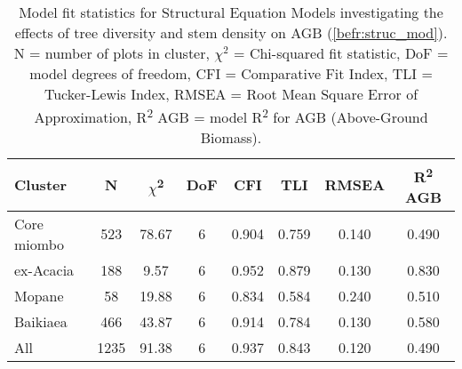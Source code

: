 \begin{table}[tb] 
	\caption[Model fit statistics per vegetation type]{Model fit statistics for Structural Equation Models investigating the effects of tree diversity and stem density on AGB (\autoref{befr:struc_mod}). N = number of plots in cluster, $\chi^{2}$ = Chi-squared fit statistic, DoF = model degrees of freedom, CFI = Comparative Fit Index, TLI = Tucker-Lewis Index, RMSEA = Root Mean Square Error of Approximation, R\textsuperscript{2} AGB = model R\textsuperscript{2} for AGB (Above-Ground Biomass).} 
	\label{befr:struc_model_fit_clust_stats} 
	\begin{tabular}{lS[table-format=4.0]S[table-format=2.2]S[table-format=1.0]S[table-format=1.3]S[table-format=1.3]S[table-format=1.3]S[table-format=1.3]} 
\toprule
{Cluster} & {N} & {$\chi$\textsuperscript{2}} & {DoF} & {CFI} & {TLI} & {RMSEA} & {R\textsuperscript{2} AGB} \\
\midrule
Core miombo & 523 & 78.67 & 6 & 0.904 & 0.759 & 0.140 & 0.490 \\ 
ex-Acacia & 188 & 9.57 & 6 & 0.952 & 0.879 & 0.130 & 0.830 \\ 
Mopane & 58 & 19.88 & 6 & 0.834 & 0.584 & 0.240 & 0.510 \\ 
Baikiaea & 466 & 43.87 & 6 & 0.914 & 0.784 & 0.130 & 0.580 \\ 
All & 1235 & 91.38 & 6 & 0.937 & 0.843 & 0.120 & 0.490 \\ 
\bottomrule
\end{tabular} 
\end{table} 
